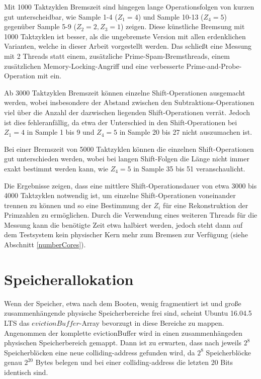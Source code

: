 Mit 1000 Taktzyklen Bremszeit sind hingegen lange Operationsfolgen von kurzen gut unterscheidbar, wie Sample 1-4 ($Z_1 = 4$) und Sample 10-13 ($Z_4 = 5$) gegenüber Sample 5-9 ($Z_2 = 2, Z_3 = 1$) zeigen.
Diese künstliche Bremsung mit 1000 Taktzyklen ist besser, als die ungebremste Version mit allen erdenklichen Varianten, welche in dieser Arbeit vorgestellt werden. Das schließt eine Messung mit 2 Threads statt einem, zusätzliche Prime-Spam-Bremsthreads, einem zusätzlichen Memory-Locking-Angriff und eine verbesserte Prime-and-Probe-Operation mit ein.

Ab 3000 Taktzyklen Bremszeit können einzelne Shift-Operationen ausgemacht werden, wobei insbesondere der Abstand zwischen den Subtraktions-Operationen viel über die Anzahl der dazwischen liegenden Shift-Operationen verrät. Jedoch ist dies fehleranfällig, da etwa der Unterschied in den Shift-Operationen bei $Z_1 = 4$ in Sample 1 bis 9 und $Z_4 = 5$ in Sample 20 bis 27 nicht auszumachen ist.

Bei einer Bremszeit von 5000 Taktzyklen können die einzelnen Shift-Operationen gut unterschieden werden, wobei bei langen Shift-Folgen die Länge nicht immer exakt bestimmt werden kann, wie $Z_4 = 5$ in Sample 35 bis 51 veranschaulicht.

Die Ergebnisse zeigen, dass eine mittlere Shift-Operationsdauer von etwa 3000 bis 4000 Taktzyklen notwendig ist, um einzelne Shift-Operationen voneinander trennen zu können und so eine Bestimmung der $Z_i$ für eine Rekonstruktion der Primzahlen zu ermöglichen.
Durch die Verwendung eines weiteren Threads für die Messung kann die benötigte Zeit etwa halbiert werden, jedoch steht dann auf dem Testsystem kein physischer Kern mehr zum Bremsen zur Verfügung (siehe Abschnitt \ref{numberCores}).

\section{Speicherallokation}

Wenn der Speicher, etwa nach dem Booten, wenig fragmentiert ist und große zusammenhängende physische Speicherbereiche frei sind, scheint Ubuntu 16.04.5 LTS das $evictionBuffer$-Array bevorzugt in diese Bereiche zu mappen.
Angenommen der komplette evictionBuffer wird in einen zusammenhängeden physischen Speicherbereich gemappt. Dann ist zu erwarten, dass nach jeweils $2^8$ Speicherblöcken eine neue colliding-address gefunden wird, da $2^8$ Speicherblöcke genau $2^{20}$ Bytes belegen und bei einer colliding-address die letzten 20 Bits identisch sind.

